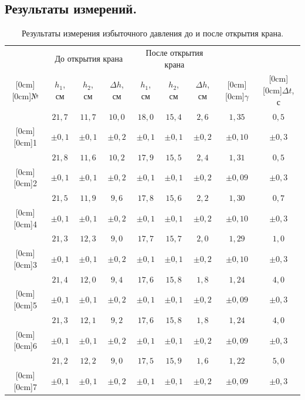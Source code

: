 \documentclass[a4paper,11pt]{article}
\begin{document}
\subsection{Результаты измерений.}
\begin{table}[h!]
\centering
\begin{tabular}{ ||c|c|c|c|c|c|c|c|c|| }
  \hline
  & \multicolumn{3}{|c|}{До открытия крана} & \multicolumn{3}{|c|}{После открытия крана} & & \\
  \cline{2-7}
  \raisebox{1.5ex}[0cm][0cm]{№} & $h_{1}$, см & $h_{2}$, см & $\Delta h$, см & $h_{1}$, см & $h_{2}$, см & $\Delta h$, см & \raisebox{1.5ex}[0cm][0cm]{$\gamma$} & \raisebox{1.5ex}[0cm][0cm]{$\Delta t$, $с$} \\
  \hline
  & $21,7$ & $11,7$ & $10,0$ & $18,0$ & $15,4$ & $2,6$ & $1,35$ & $0,5$ \\
  \raisebox{1.5ex}[0cm][0cm]{1} & $\pm 0,1$ & $\pm 0,1$ & $\pm 0,2$ & $\pm 0,1$ & $\pm 0,1$ & $\pm 0,2$ & $\pm 0,10$ & $\pm 0,3$ \\
  & $21,8$ & $11,6$ & $10,2$ & $17,9$ & $15,5$ & $2,4$ & $1,31$ & $0,5$ \\
  \raisebox{1.5ex}[0cm][0cm]{2} & $\pm 0,1$ & $\pm 0,1$ & $\pm 0,2$ & $\pm 0,1$ & $\pm 0,1$ & $\pm 0,2$ & $\pm 0,09$ & $\pm 0,3$ \\
  & $21,5$ & $11,9$ & $9,6$ & $17,8$ & $15,6$ & $2,2$ & $1,30$ & $0,7$ \\
  \raisebox{1.5ex}[0cm][0cm]{4} & $\pm 0,1$ & $\pm 0,1$ & $\pm 0,2$ & $\pm 0,1$ & $\pm 0,1$ & $\pm 0,2$ & $\pm 0,10$ & $\pm 0,3$ \\
  & $21,3$ & $12,3$ & $9,0$ & $17,7$ & $15,7$ & $2,0$ & $1,29$ & $1,0$ \\
  \raisebox{1.5ex}[0cm][0cm]{3} & $\pm 0,1$ & $\pm 0,1$ & $\pm 0,2$ & $\pm 0,1$ & $\pm 0,1$ & $\pm 0,2$ & $\pm 0,10$ & $\pm 0,3$ \\
  & $21,4$ & $12,0$ & $9,4$ & $17,6$ & $15,8$ & $1,8$ & $1,24$ & $4,0$ \\
  \raisebox{1.5ex}[0cm][0cm]{5} & $\pm 0,1$ & $\pm 0,1$ & $\pm 0,2$ & $\pm 0,1$ & $\pm 0,1$ & $\pm 0,2$ & $\pm 0,09$ & $\pm 0,3$ \\
  & $21,3$ & $12,1$ & $9,2$ & $17,6$ & $15,8$ & $1,8$ & $1,24$ & $4,0$ \\
  \raisebox{1.5ex}[0cm][0cm]{6} & $\pm 0,1$ & $\pm 0,1$ & $\pm 0,2$ & $\pm 0,1$ & $\pm 0,1$ & $\pm 0,2$ & $\pm 0,09$ & $\pm 0,3$ \\
  & $21,2$ & $12,2$ & $9,0$ & $17,5$ & $15,9$ & $1,6$ & $1,22$ & $5,0$ \\
  \raisebox{1.5ex}[0cm][0cm]{7} & $\pm 0,1$ & $\pm 0,1$ & $\pm 0,2$ & $\pm 0,1$ & $\pm 0,1$ & $\pm 0,2$& $\pm 0,09$ & $\pm 0,3$ \\
  \hline
\end{tabular}
\caption{Результаты измерения избыточного давления до и после открытия крана.}
\label{table:tab2}
\end{table}
\end{document}
